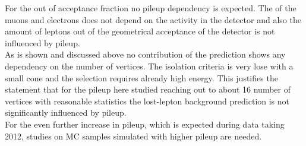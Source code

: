 For the out of acceptance fraction no pileup dependency is expected. The \pt of the muons and electrons does not depend on the activity in the detector and also the amount of leptons out of the geometrical acceptance of the detector is not influenced by pileup.\\%
As is shown and discussed above no contribution of the prediction shows any dependency on the number of vertices. The isolation criteria is very lose with a small cone and the selection requires already high energy. This justifies the statement that for the pileup here studied reaching out to about 16 number of vertices with reasonable statistics the lost-lepton background prediction is not significantly influenced by pileup.\\
For the even further increase in pileup, which is expected during data taking 2012, studies on MC samples simulated with higher pileup are needed. 

\clearpage

